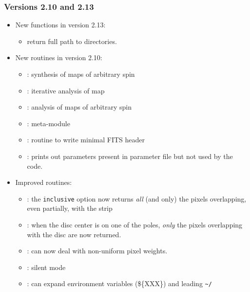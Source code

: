 \documentclass[12pt,twoside]{article}
\newcommand{\compresslist}{%
\setlength{\itemsep}{0ex}}{}
\begin{document}
{\subsubsection*{Versions 2.10 and 2.13}
\begin{itemize}\compresslist
\item New functions in version 2.13: 
\begin{itemize}\compresslist
	\item{} return full path to \healpix directories.
\end{itemize}
\item New routines in version 2.10: 
\begin{itemize}
	\item{}: synthesis of maps of
arbitrary spin
	\item{}: iterative analysis of map
	\item{}: analysis of maps of
arbitrary spin
	\item{}: meta-module
	\item{}: routine
to write minimal FITS header
	\item{}: prints out
parameters present in parameter file but not used by the code.
\end{itemize}
\item Improved routines:
\begin{itemize}\compresslist
\item {}: the {\tt inclusive} option now
returns {\em all} (and only) the pixels overlapping, even partially, with the
strip
\item {}: when the disc center is on one of
the poles, {\em only} the pixels overlapping with the disc are now returned.
\item {}: can now deal with non-uniform
pixel weights.
\item {}: silent mode
\item {}: can expand environment variables
(\$\{XXX\}) and leading %
\texttt{\textasciitilde/}
\end{itemize}


\end{itemize}}
\end{document}
